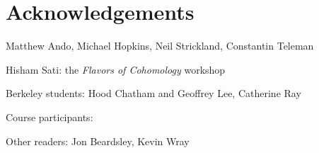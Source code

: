 
\section*{Acknowledgements}

Matthew Ando, Michael Hopkins, Neil Strickland, Constantin Teleman

Hisham Sati: the \textit{Flavors of Cohomology} workshop

Berkeley students: Hood Chatham and Geoffrey Lee, Catherine Ray

Course participants:

Other readers: Jon Beardsley, Kevin Wray
